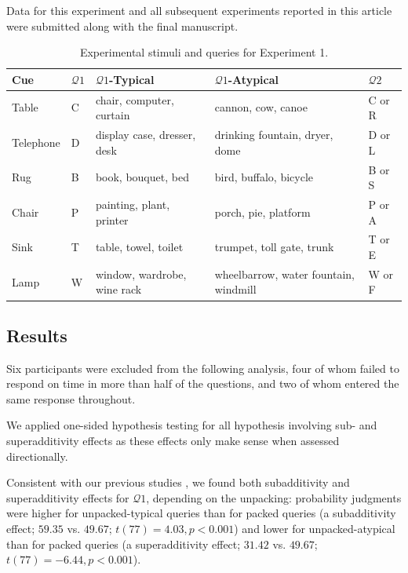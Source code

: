Data for this experiment and all subsequent experiments reported in this article were submitted along with the final manuscript.

\begin{table}
\caption{Experimental stimuli and queries for Experiment 1.}
\label{tab:scenarios}
\centering
\begin{tabular}{p{} p{} >{\raggedright}p{} >{\raggedright}p{} p{}}
  \toprule

\bf{Cue} & \bf{$\mathcal{Q}1$} & \bf{$\mathcal{Q}1$-Typical} & \bf{$\mathcal{Q}1$-Atypical}& \bf{$\mathcal{Q}2$}\tabularnewline

\midrule
Table & C & chair, computer, curtain & cannon, cow, canoe & C or R\tabularnewline

Telephone & D & display case, dresser, desk & drinking fountain, dryer, dome & D or L\tabularnewline

Rug & B & book, bouquet, bed & bird, buffalo, bicycle & B or S\tabularnewline

Chair & P & painting, plant, printer & porch, pie, platform & P or A\tabularnewline

Sink & T & table, towel, toilet & trumpet, toll gate, trunk &T or E\tabularnewline

Lamp & W & window, wardrobe, wine rack & wheelbarrow, water fountain, windmill & W or F \tabularnewline
\bottomrule
\end{tabular}
\end{table}

\subsection{Results}

Six participants were excluded from the following analysis, four of whom failed to respond on time in more than half of the questions, and two of whom entered the same response throughout.

We applied one-sided hypothesis testing for all hypothesis involving sub- and superadditivity effects as these effects only make sense when assessed directionally.

Consistent with our previous studies \citep{dasgupta2017hypotheses}, we found both subadditivity and superadditivity effects for $\mathcal{Q}1$, depending on the unpacking: probability judgments were higher for unpacked-typical queries than for packed queries (a subadditivity effect; $59.35$ vs. $49.67$; $t(77)= 4.03, p<0.001$) and lower for unpacked-atypical than for packed queries (a superadditivity effect; $31.42$ vs. $49.67$; $t(77)= -6.44, p<0.001$).

